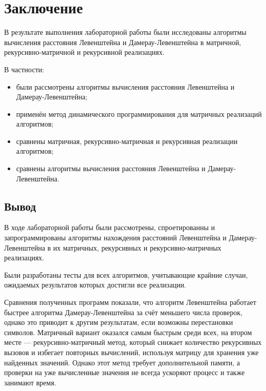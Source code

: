 \section*{Заключение}

\hspace{1.25cm}
В результате выполнения лабораторной работы были исследованы алгоритмы вычисления расстояния Левенштейна и Дамерау-Левенштейна в матричной, рекурсивно-матричной и рекурсивной реализациях.

\vspace{0.25cm}
В частности:

\begin{itemize}

\item были рассмотрены алгоритмы вычисления расстояния Левенштейна и Дамерау-Левенштейна;

\item применён метод динамического программирования для матричных реализаций алгоритмов;

\item сравнены матричная, рекурсивно-матричная и рекурсивная реализации алгоритмов;

\item сравнены алгоритмы вычисления расстояния Левенштейна и Дамерау-Левенштейна.

\end{itemize}

\subsection*{Вывод}

\hspace{1.25cm}
В ходе лабораторной работы были рассмотрены, спроетированны и запрограммированы алгоритмы нахождения расстояний Левенштейна и Дамерау-Левенштейна в их матричных, рекурсивных и рекурсивно-матричных реализациях.

Были разработаны тесты для всех алгоритмов, учитывающие крайние случаи, ожидаемых результатов которых достигли все реализации.

Сравнения полученных программ показали, что алгоритм Левенштейна работает быстрее алгоритма Дамерау-Левенштейна за счёт меньшего числа проверок, однако это приводит к другим результатам, если возможны перестановки символов. Матричный вариант оказался самым быстрым среди всех, на втором месте — рекурсивно-матричный метод, который снижает количество рекурсивных вызовов и избегает повторных вычислений, используя матрицу для хранения уже найденных значений. Однако этот метод требует дополнительной памяти, а проверки на уже вычисленные значения не всегда ускоряют процесс и также занимают время.

\newpage